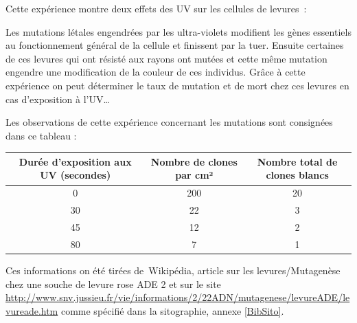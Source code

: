 Cette expérience montre deux effets des UV sur les cellules de levures :

Les mutations létales engendrées par les ultra-violets modifient les gènes essentiels au fonctionnement général de la cellule et finissent par la tuer. Ensuite certaines de ces levures qui ont résisté aux rayons ont mutées et cette même mutation engendre une modification de la couleur de ces individus. Grâce à cette expérience on peut déterminer le taux de mutation et de mort chez ces levures en cas d’exposition à l’UV…

Les observations de cette expérience concernant les mutations sont consignées dans ce tableau : 

\begin{center}
	\begin{tabular}{ c | c | c  }
	   Durée d’exposition aux UV (secondes) & Nombre de clones par cm² & Nombre total de clones blancs \\ \hline \hline
	   0 & 200 & 20 \\ \hline
	   30 & 22 & 3 \\ \hline
	   45 & 12 & 2 \\ \hline
	   80 & 7 & 1
	\end{tabular}
\end{center}


Ces informations on été tirées de Wikipédia, article sur les levures/Mutagenèse chez une souche de levure rose ADE 2 et sur le site \url{http://www.snv.jussieu.fr/vie/informations/2/22ADN/mutagenese/levureADE/levureade.htm} comme spécifié dans la sitographie, annexe \ref{BibSito}.

